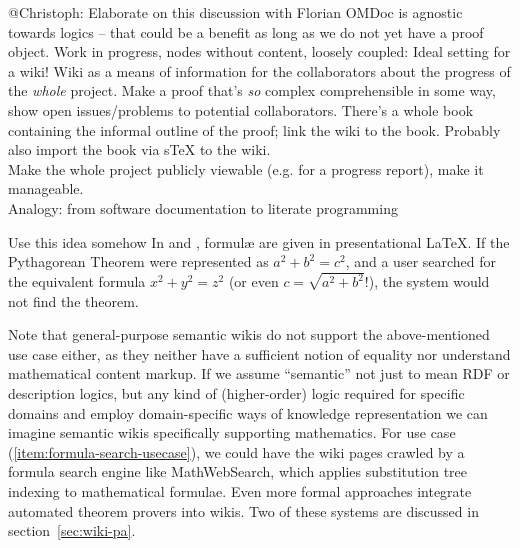 
\begin{todo}{@Christoph: Elaborate on this discussion with Florian}
  OMDoc is agnostic towards logics -- that could be a benefit as long as we do not yet
  have a proof object. Work in progress, nodes without content, loosely coupled: Ideal
  setting for a wiki!  Wiki as a means of information for the collaborators about the
  progress of the \emph{whole} project.  Make a proof that's \emph{so} complex
  comprehensible in some way, show open issues/problems to potential collaborators.
  There's a whole book containing the informal outline of the proof; link the wiki to the
  book.  Probably also import the book via sTeX to the wiki.\\
  Make the whole project publicly viewable (e.g. for a progress report), make it
  manageable.\\
  Analogy: from software documentation to literate programming
\end{todo}


\begin{oldpart}{Use this idea somehow}
  In  and , formulæ are given in presentational
  {\LaTeX}.  If the Pythagorean Theorem were represented as $a^2 + b^2 = c^2$, and a user
  searched for the equivalent formula $x^2 + y^2 = z^2$ (or even $c=\sqrt{a^2+b^2}$!), the
  system would not find the theorem.

  Note that general-purpose semantic wikis do not support the above-mentioned use case
  either, as they neither have a sufficient notion of equality nor understand mathematical
  content markup.  If we assume ``semantic'' not just to mean RDF or description logics,
  but any kind of (higher-order) logic required for specific domains and employ
  domain-specific ways of knowledge representation we can imagine semantic wikis
  specifically supporting mathematics.  For use case (\ref{item:formula-search-usecase}),
  we could have the wiki pages crawled by a formula search engine like
  MathWebSearch\cite{KohSuc:asemf06}, which applies substitution tree indexing to
  mathematical formulae.  Even more formal approaches integrate automated theorem provers
  into wikis.  Two of these systems are discussed in section~\ref{sec:wiki-pa}.
\end{oldpart}




